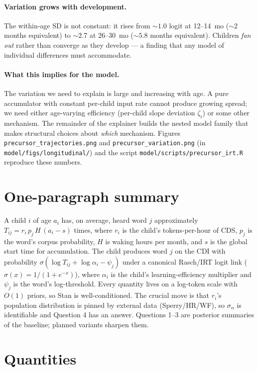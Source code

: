\documentclass[11pt]{article}
\newcommand{\sigmoid}{\sigma}
\begin{document}
\paragraph{Variation grows with development.} The within-age SD is
not constant: it rises from \(\sim 1.0\) logit at 12--14~mo
(\(\sim 2\) months equivalent) to \(\sim 2.7\) at 26--30~mo
(\(\sim 5.8\) months equivalent). Children \emph{fan out} rather
than converge as they develop — a finding that any model of
individual differences must accommodate.

\paragraph{What this implies for the model.} The variation we need
to explain is large and increasing with age. A pure accumulator
with constant per-child input rate cannot produce growing spread; we
need either age-varying efficiency (per-child slope deviation
\(\zeta_i\)) or some other mechanism. The remainder of the
explainer builds the nested model family that makes structural
choices about \emph{which} mechanism. Figures
\texttt{precursor\_trajectories.png} and
\texttt{precursor\_variation.png} (in
\texttt{model/figs/longitudinal/}) and the script
\texttt{model/scripts/precursor\_irt.R} reproduce these numbers.

\section{One-paragraph summary}

A child \(i\) of age \(a_i\) has, on average, heard word \(j\) approximately
\(T_{ij} = r_i\,p_j\,H\,(a_i - s)\) times, where \(r_i\) is the child's
tokens-per-hour of CDS, \(p_j\) is the word's corpus probability, \(H\) is
waking hours per month, and \(s\) is the global start time for
accumulation. The child produces word \(j\) on the CDI with probability
\(\sigmoid(\log T_{ij} + \log \alpha_i - \psi_j)\) under a canonical
Rasch/IRT logit link (\(\sigmoid(x) = 1/(1+e^{-x})\)), where \(\alpha_i\)
is the child's learning-efficiency multiplier and \(\psi_j\) is the
word's log-threshold. Every quantity lives on a log-token scale with
\(O(1)\) priors, so Stan is well-conditioned. The crucial move is that
\(r_i\)'s population distribution is pinned by external data
(Sperry/HR/WF), so \(\sigma_\alpha\) is identifiable and Question 4 has an
answer. Questions 1--3 are posterior summaries of the baseline;
planned variants sharpen them.

\section{Quantities}
\end{document}
